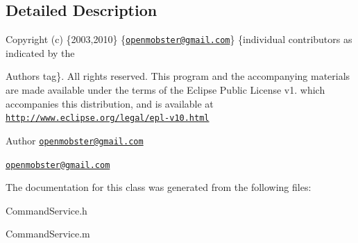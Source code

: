 \subsection{\-Detailed \-Description}
\-Copyright (c) \{2003,2010\} \{\href{mailto:openmobster@gmail.com}{\tt openmobster@gmail.\-com}\} \{individual contributors as indicated by the \begin{DoxyAuthor}{\-Authors}
tag\}. \-All rights reserved. \-This program and the accompanying materials are made available under the terms of the \-Eclipse \-Public \-License v1. which accompanies this distribution, and is available at \href{http://www.eclipse.org/legal/epl-v10.html}{\tt http\-://www.\-eclipse.\-org/legal/epl-\/v10.\-html}
\end{DoxyAuthor}
\begin{DoxyAuthor}{\-Author}
\href{mailto:openmobster@gmail.com}{\tt openmobster@gmail.\-com}

\href{mailto:openmobster@gmail.com}{\tt openmobster@gmail.\-com} 
\end{DoxyAuthor}


\-The documentation for this class was generated from the following files\-:\begin{DoxyCompactItemize}
\item 
\-Command\-Service.\-h\item 
\-Command\-Service.\-m\end{DoxyCompactItemize}
